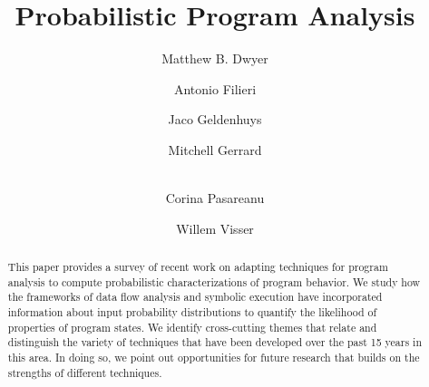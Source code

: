\documentclass[runningheads,a4paper]{llncs}
\begin{document}
\mainmatter  %

\newcommand{\mycomment}[1]{\textit{\textcolor{red}{#1}}}
\newcommand{\ignore}[1]{}

\title{Probabilistic Program Analysis}


\author{Matthew B. Dwyer
\and Antonio Filieri\and Jaco Geldenhuys\and Mitchell Gerrard\and\\
Corina Pasareanu\and Willem Visser}
%


%
%

\maketitle


\begin{abstract}
This paper provides a survey of recent work on adapting 
techniques for program analysis to compute probabilistic
characterizations of program behavior.  We study how the
frameworks of data flow analysis and symbolic execution have
incorporated information about input probability distributions
to quantify the likelihood of properties of program states.
We identify cross-cutting themes that relate and distinguish
the variety of
techniques that have been developed over the past 15 years
in this area.  In doing so, we point out opportunities for
future research that builds on the strengths of different techniques.
\end{abstract}
\end{document}

